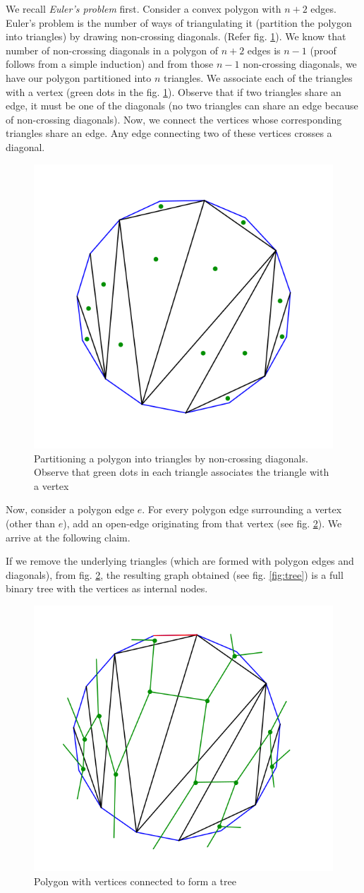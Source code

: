 We recall \emph{Euler's problem} first. Consider a convex polygon with $n+2$ edges. Euler's problem is the number of ways of triangulating it (partition the polygon into triangles) by drawing non-crossing diagonals. (Refer fig. \ref{fig:Euler's-polygon}). We know that number of non-crossing diagonals in a polygon of $n+2$ edges is $n-1$ (proof follows from a simple induction) and from those $n-1$ non-crossing diagonals, we have our polygon partitioned into $n$ triangles. We associate each of the triangles with a vertex (green dots in the fig. \ref{fig:Euler's-polygon}). Observe that if two triangles share an edge, it must be one of the diagonals (no two triangles can share an edge because of non-crossing diagonals). Now, we connect the vertices whose corresponding triangles share an edge. Any edge connecting two of these vertices crosses a diagonal. 
\begin{figure}[h!]
    \centering
    \includegraphics[width=0.4\linewidth]{images/polygon.png}
    \caption{Partitioning a polygon into triangles by non-crossing diagonals. Observe that green dots in each triangle associates the triangle with a vertex}
    \label{fig:Euler's-polygon}
\end{figure}
Now, consider a polygon edge $e$. For every polygon edge surrounding a vertex (other than $e$), add an open-edge originating from that vertex (see fig. \ref{fig:tree-in-polygon}). We arrive at the following claim.  
\begin{claim}
	If we remove the underlying triangles (which are formed with polygon edges and diagonals), from fig. \ref{fig:tree-in-polygon}, the 		resulting graph obtained (see fig. \ref{fig:tree}) is a full binary tree with the vertices as internal nodes.
\end{claim}
\begin{figure}[h!]
    \centering
    \includegraphics[width=0.4\linewidth]{images/polygon-tree.png}
    \caption{Polygon with vertices connected to form a tree}
    \label{fig:tree-in-polygon}
\end{figure}
